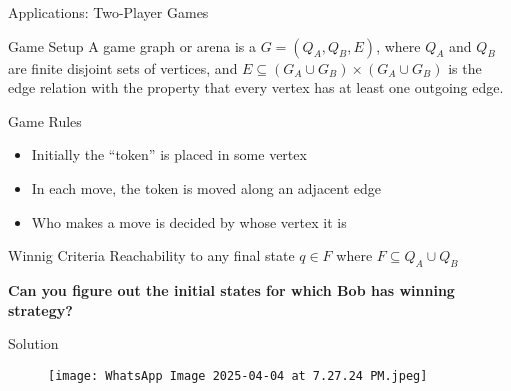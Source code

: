 \documentclass[10pt,svgnames,fragile]{beamer}
\begin{document}
\begin{frame}{Applications: Two-Player Games}
  \begin{block}{Game Setup}
      A game graph or arena is a $G = (Q_A, Q_B, E)$, where $Q_A$ and $Q_B$ are finite disjoint sets of vertices, and $E \subseteq (G_A \cup G_B) \times (G_A \cup G_B)$ is the edge relation with the property that every vertex has at least one outgoing edge.
  \end{block}
  \pause 
  \begin{block}{Game Rules}
      \begin{itemize}
          \item Initially the “token” is placed in some vertex
          \item In each move, the token is moved along an adjacent edge
          \item Who makes a move is decided by whose vertex it is
          
      \end{itemize}
  \end{block}
  \pause 
  \begin{block}{Winnig Criteria}
      Reachability to any final state $q \in F$ where $F \subseteq Q_A \cup Q_B$
  \end{block}
  \pause 
\vspace{4pt}
  \textbf{Can you figure out the initial states for which Bob has winning strategy?}
\end{frame}

\begin{frame}{Solution}

    \begin{center}
        \begin{figure}[h]
            \texttt{[image: WhatsApp Image 2025-04-04 at 7.27.24 PM.jpeg]}
            \label{fig:enter-label}
        \end{figure}
    \end{center}
\end{frame}
\end{document}
